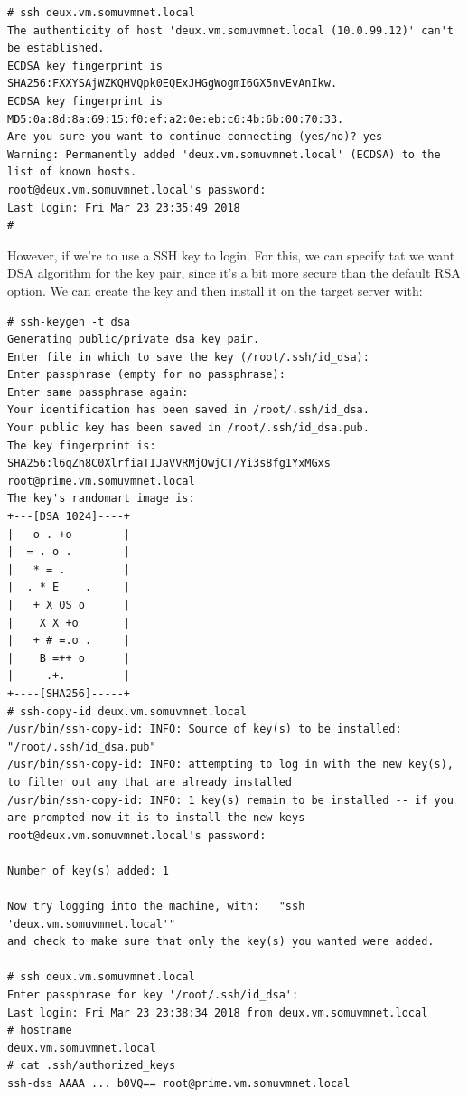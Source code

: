 \vspace{-15pt}
\begin{verbatim}
# ssh deux.vm.somuvmnet.local
The authenticity of host 'deux.vm.somuvmnet.local (10.0.99.12)' can't be established.
ECDSA key fingerprint is SHA256:FXXYSAjWZKQHVQpk0EQExJHGgWogmI6GX5nvEvAnIkw.
ECDSA key fingerprint is MD5:0a:8d:8a:69:15:f0:ef:a2:0e:eb:c6:4b:6b:00:70:33.
Are you sure you want to continue connecting (yes/no)? yes
Warning: Permanently added 'deux.vm.somuvmnet.local' (ECDSA) to the list of known hosts.
root@deux.vm.somuvmnet.local's password: 
Last login: Fri Mar 23 23:35:49 2018
#
\end{verbatim}
\vspace{-10pt}	

\noindent
However, if we're to use a SSH key to login. For this, we can specify tat we want DSA algorithm for the key pair, since it's a bit more secure than the default RSA option. We can create the key and then install it on the target server with:

\vspace{-15pt}
\begin{verbatim}
# ssh-keygen -t dsa
Generating public/private dsa key pair.
Enter file in which to save the key (/root/.ssh/id_dsa): 
Enter passphrase (empty for no passphrase): 
Enter same passphrase again: 
Your identification has been saved in /root/.ssh/id_dsa.
Your public key has been saved in /root/.ssh/id_dsa.pub.
The key fingerprint is:
SHA256:l6qZh8C0XlrfiaTIJaVVRMjOwjCT/Yi3s8fg1YxMGxs root@prime.vm.somuvmnet.local
The key's randomart image is:
+---[DSA 1024]----+
|   o . +o        |
|  = . o .        |
|   * = .         |
|  . * E    .     |
|   + X OS o      |
|    X X +o       |
|   + # =.o .     |
|    B =++ o      |
|     .+.         |
+----[SHA256]-----+
# ssh-copy-id deux.vm.somuvmnet.local
/usr/bin/ssh-copy-id: INFO: Source of key(s) to be installed: "/root/.ssh/id_dsa.pub"
/usr/bin/ssh-copy-id: INFO: attempting to log in with the new key(s), to filter out any that are already installed
/usr/bin/ssh-copy-id: INFO: 1 key(s) remain to be installed -- if you are prompted now it is to install the new keys
root@deux.vm.somuvmnet.local's password: 

Number of key(s) added: 1

Now try logging into the machine, with:   "ssh 'deux.vm.somuvmnet.local'"
and check to make sure that only the key(s) you wanted were added.

# ssh deux.vm.somuvmnet.local
Enter passphrase for key '/root/.ssh/id_dsa': 
Last login: Fri Mar 23 23:38:34 2018 from deux.vm.somuvmnet.local
# hostname
deux.vm.somuvmnet.local
# cat .ssh/authorized_keys
ssh-dss AAAA ... b0VQ== root@prime.vm.somuvmnet.local
\end{verbatim}
\vspace{-10pt}	

